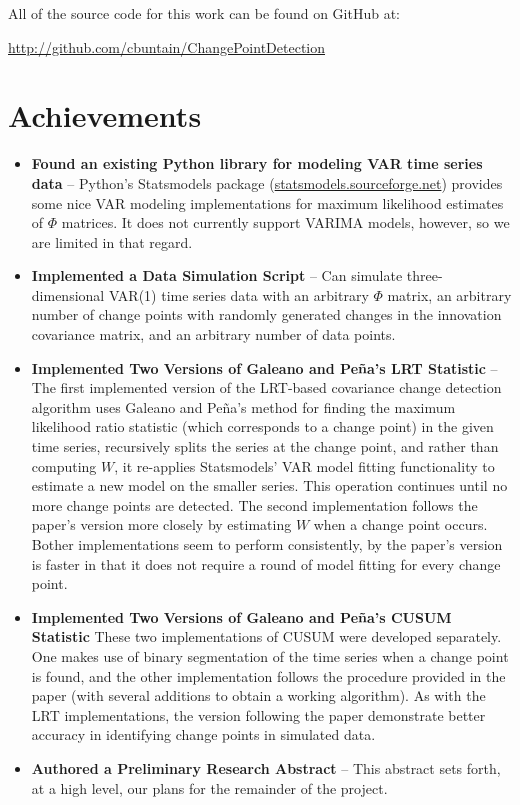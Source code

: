\documentclass[10pt,letterpaper]{article}
\begin{document}
\maketitle

All of the source code for this work can be found on GitHub at:

\url{http://github.com/cbuntain/ChangePointDetection}

\section{Achievements}

\begin{itemize}
\item \textbf{Found an existing Python library for modeling VAR time series data} -- Python's Statsmodels package (\url{statsmodels.sourceforge.net}) provides some nice VAR modeling implementations for maximum likelihood estimates of $\Phi$ matrices. It does not currently support VARIMA models, however, so we are limited in that regard.
\item \textbf{Implemented a Data Simulation Script} -- Can simulate three-dimensional VAR(1) time series data with an arbitrary $\Phi$ matrix, an arbitrary number of change points with randomly generated changes in the innovation covariance matrix, and an arbitrary number of data points.
\item \textbf{Implemented Two Versions of Galeano and Pe\~{n}a's LRT Statistic} -- The first implemented version of the LRT-based covariance change detection algorithm uses Galeano and Pe\~{n}a's method for finding the maximum likelihood ratio statistic (which corresponds to a change point) in the given time series, recursively splits the series at the change point, and rather than computing $W$, it re-applies Statsmodels' VAR model fitting functionality to estimate a new model on the smaller series. This operation continues until no more change points are detected. The second implementation follows the paper's version more closely by estimating $W$ when a change point occurs. Bother implementations seem to perform consistently, by the paper's version is faster in that it does not require a round of model fitting for every change point.
\item \textbf{Implemented Two Versions of Galeano and Pe\~{n}a's CUSUM Statistic} These two implementations of CUSUM were developed separately. One makes use of binary segmentation of the time series when a change point is found, and the other implementation follows the procedure provided in the paper (with several additions to obtain a working algorithm). As with the LRT implementations, the version following the paper demonstrate better accuracy in identifying change points in simulated data.
\item \textbf{Authored a Preliminary Research Abstract} -- This abstract sets forth, at a high level, our plans for the remainder of the project.
\end{itemize}
\end{document}
